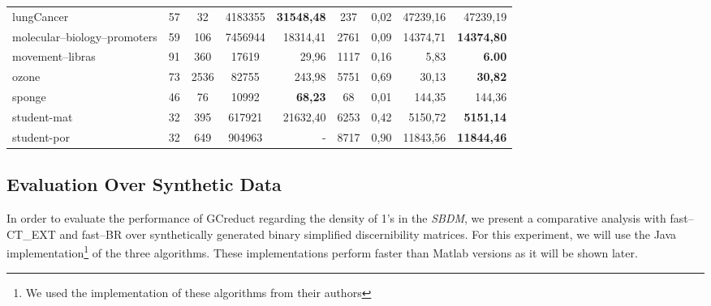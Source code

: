 \documentclass[authoryear,preprint,review,12pt]{elsarticle}
\begin{document}
\begin{table}[!htb]
\begin{tabular}{|l|c|c|c|r|c|c|r|r|}
			lungCancer & 57 & 32 & 4183355 & \textbf{31548,48} & 237 & 0,02 & 47239,16 & 47239,19 \\ %
			molecular--biology--promoters & 59 & 106 & 7456944 & 18314,41 & 2761 & 0,09 & 14374,71 & \textbf{14374,80} \\ %
			movement--libras & 91 & 360 & 17619 & 29,96 & 1117 & 0,16 & 5,83 & \textbf{6.00} \\ %
			ozone & 73 & 2536 & 82755 & 243,98 & 5751 & 0,69 & 30,13 & \textbf{30,82} \\ %
			sponge & 46 & 76 & 10992 & \textbf{68,23} & 68 & 0,01 & 144,35 & 144,36 \\ %
			student-mat & 32 & 395 & 617921 & 21632,40 & 6253 & 0,42 & 5150,72 & \textbf{5151,14}\\
			student-por & 32 & 649 & 904963 & - & 8717 & 0,90 & 11843,56 & \textbf{11844,46} \\
    		\hline
    	\end{tabular}
    \end{table}
    

\subsection{Evaluation Over Synthetic Data}
	In order to evaluate the performance of GCreduct regarding the density of 1's in the \textit{SBDM}, we present a comparative analysis with fast--CT\_EXT and fast--BR over synthetically generated binary simplified discernibility matrices. For this experiment, we will use the Java implementation\footnote{We used the implementation of these algorithms from their authors} of the three algorithms. These implementations perform faster than Matlab versions as it will be shown later.
	
\end{document}
